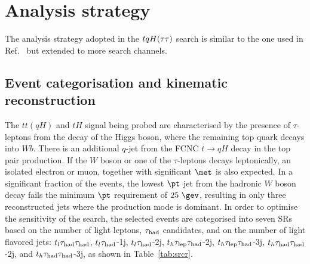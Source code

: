 \section{Analysis strategy}
\label{sec:strategy_Htautau}

The analysis strategy adopted in the $tqH(\tau\tau)$ search is similar to the one used in Ref.~\cite{fcnc36,Chen:2015nta} but extended to more search channels.

\subsection{Event categorisation and kinematic reconstruction}
\label{sec:htautau_reco_cat}

The $tt(qH)$ and $tH$ signal being probed are characterised by the presence of $\tau$-leptons from the decay of 
the Higgs boson, where the remaining top quark decays into $Wb$. There is an additional $q$-jet from the FCNC $t\to qH$ decay in the top pair production. 
If the $W$ boson or one of the $\tau$-leptons decays leptonically, an isolated electron or muon, together with significant $\met$ is also expected.
In a significant fraction of the events, the lowest $\pt$ jet from the hadronic $W$ boson decay fails the minimum $\pt$ requirement of $25~\gev$,
resulting in only three reconstructed jets where the production mode is dominant. 
In order to optimise the sensitivity of the search, the selected events are categorised into seven SRs based on the number of light leptons,
$\tau_{\mathrm{had}}$ candidates, and on the number of light flavored jets:
$t_l\tau_{\mathrm{had}} \tau_{\mathrm{had}}$, $t_l\tau_{\mathrm{had}}$-1j, $t_l\tau_{\mathrm{had}}$-2j, $t_h\tau_{\mathrm{lep}} \tau_{\mathrm{had}}$-2j, $t_h\tau_{\mathrm{lep}} \tau_{\mathrm{had}}$-3j, $t_h\tau_{\mathrm{had}} \tau_{\mathrm{had}}$-2j, and $t_h\tau_{\mathrm{had}} \tau_{\mathrm{had}}$-3j, as shown in Table~\ref{tab:srcr}. 

